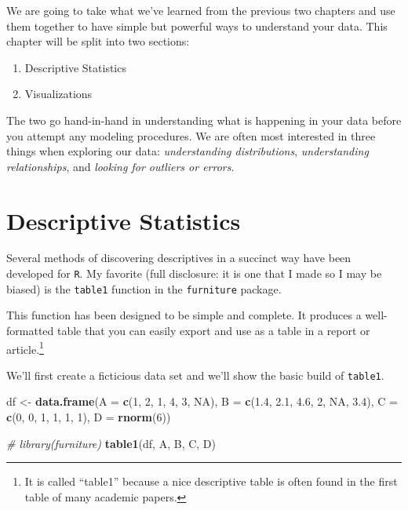 \documentclass[]{tufte-book}
\newenvironment{Shaded}{}{}
\newcommand{\KeywordTok}[1]{\textcolor[rgb]{0.00,0.44,0.13}{\textbf{#1}}}
\newcommand{\DataTypeTok}[1]{\textcolor[rgb]{0.56,0.13,0.00}{#1}}
\newcommand{\DecValTok}[1]{\textcolor[rgb]{0.25,0.63,0.44}{#1}}
\newcommand{\FloatTok}[1]{\textcolor[rgb]{0.25,0.63,0.44}{#1}}
\newcommand{\StringTok}[1]{\textcolor[rgb]{0.25,0.44,0.63}{#1}}
\newcommand{\CommentTok}[1]{\textcolor[rgb]{0.38,0.63,0.69}{\textit{#1}}}
\newcommand{\OtherTok}[1]{\textcolor[rgb]{0.00,0.44,0.13}{#1}}
\newcommand{\NormalTok}[1]{#1}
\providecommand{\tightlist}{%
  \setlength{\itemsep}{0pt}\setlength{\parskip}{0pt}}
\theoremstyle{definition}
\theoremstyle{definition}
\theoremstyle{remark}
\begin{document}
We are going to take what we've learned from the previous two chapters
and use them together to have simple but powerful ways to understand
your data. This chapter will be split into two sections:

\begin{enumerate}
\def\labelenumi{\arabic{enumi}.}
\tightlist
\item
  Descriptive Statistics
\item
  Visualizations
\end{enumerate}

The two go hand-in-hand in understanding what is happening in your data
before you attempt any modeling procedures. We are often most interested
in three things when exploring our data: \emph{understanding
distributions}, \emph{understanding relationships}, and \emph{looking
for outliers or errors}.

\section*{Descriptive Statistics}\label{descriptive-statistics}

Several methods of discovering descriptives in a succinct way have been
developed for \texttt{R}. My favorite (full disclosure: it is one that I
made so I may be biased) is the \texttt{table1} function in the
\texttt{furniture} package.

This function has been designed to be simple and complete. It produces a
well-formatted table that you can easily export and use as a table in a
report or article.\footnote{It is called ``table1'' because a nice
  descriptive table is often found in the first table of many academic
  papers.}

We'll first create a ficticious data set and we'll show the basic build
of \texttt{table1}.

\begin{Shaded}
\begin{Highlighting}[]
\NormalTok{df <-}\StringTok{ }\KeywordTok{data.frame}\NormalTok{(}\DataTypeTok{A =} \KeywordTok{c}\NormalTok{(}\DecValTok{1}\NormalTok{, }\DecValTok{2}\NormalTok{, }\DecValTok{1}\NormalTok{, }\DecValTok{4}\NormalTok{, }\DecValTok{3}\NormalTok{, }\OtherTok{NA}\NormalTok{), }\DataTypeTok{B =} \KeywordTok{c}\NormalTok{(}\FloatTok{1.4}\NormalTok{, }
    \FloatTok{2.1}\NormalTok{, }\FloatTok{4.6}\NormalTok{, }\DecValTok{2}\NormalTok{, }\OtherTok{NA}\NormalTok{, }\FloatTok{3.4}\NormalTok{), }\DataTypeTok{C =} \KeywordTok{c}\NormalTok{(}\DecValTok{0}\NormalTok{, }\DecValTok{0}\NormalTok{, }\DecValTok{1}\NormalTok{, }\DecValTok{1}\NormalTok{, }\DecValTok{1}\NormalTok{, }
    \DecValTok{1}\NormalTok{), }\DataTypeTok{D =} \KeywordTok{rnorm}\NormalTok{(}\DecValTok{6}\NormalTok{))}

\CommentTok{# library(furniture)}
\KeywordTok{table1}\NormalTok{(df, A, B, C, D)}
\end{Highlighting}
\end{Shaded}
\end{document}
